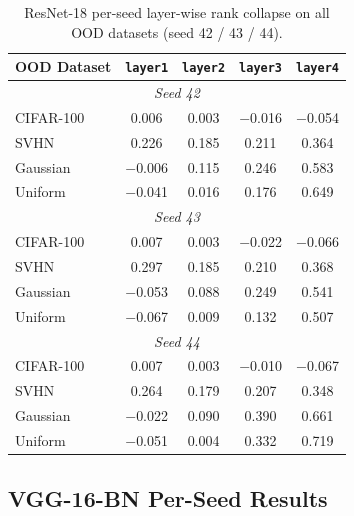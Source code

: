 \documentclass{article}
\begin{document}
\begin{table}[h]
\centering
\caption{ResNet-18 per-seed layer-wise rank collapse on all OOD datasets (seed 42 / 43 / 44).}
\label{tab:resnet_rc_perseed}
\small
\begin{tabular}{@{}lcccc@{}}
\toprule
OOD Dataset & \texttt{layer1} & \texttt{layer2} & \texttt{layer3} & \texttt{layer4} \\
\midrule
\multicolumn{5}{c}{\emph{Seed 42}} \\
CIFAR-100 & 0.006 & 0.003 & $-$0.016 & $-$0.054 \\
SVHN & 0.226 & 0.185 & 0.211 & 0.364 \\
Gaussian & $-$0.006 & 0.115 & 0.246 & 0.583 \\
Uniform & $-$0.041 & 0.016 & 0.176 & 0.649 \\
\midrule
\multicolumn{5}{c}{\emph{Seed 43}} \\
CIFAR-100 & 0.007 & 0.003 & $-$0.022 & $-$0.066 \\
SVHN & 0.297 & 0.185 & 0.210 & 0.368 \\
Gaussian & $-$0.053 & 0.088 & 0.249 & 0.541 \\
Uniform & $-$0.067 & 0.009 & 0.132 & 0.507 \\
\midrule
\multicolumn{5}{c}{\emph{Seed 44}} \\
CIFAR-100 & 0.007 & 0.003 & $-$0.010 & $-$0.067 \\
SVHN & 0.264 & 0.179 & 0.207 & 0.348 \\
Gaussian & $-$0.022 & 0.090 & 0.390 & 0.661 \\
Uniform & $-$0.051 & 0.004 & 0.332 & 0.719 \\
\bottomrule
\end{tabular}
\end{table}

\subsection{VGG-16-BN Per-Seed Results}
\end{document}
